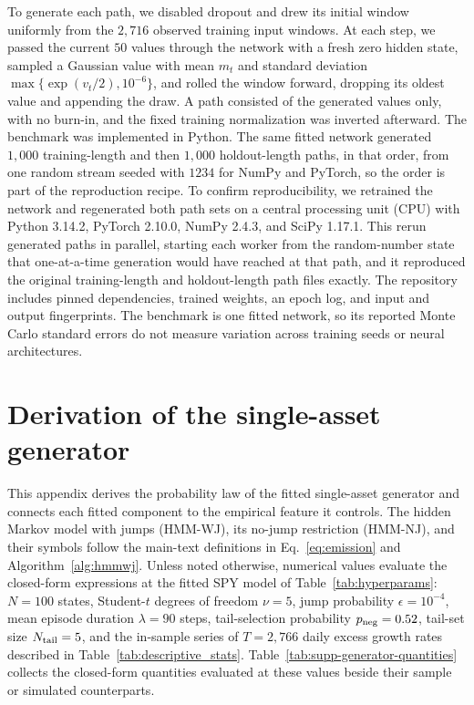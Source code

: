 To generate each path, we disabled dropout and drew its initial
window uniformly from the $2{,}716$ observed training input windows.
At each step, we passed the current $50$ values through the network
with a fresh zero hidden state, sampled a Gaussian value with mean
$m_t$ and standard deviation $\max\{\exp(v_t/2),10^{-6}\}$, and
rolled the window forward, dropping its oldest value and appending
the draw. A path consisted of the generated values only, with no
burn-in, and the fixed training normalization was inverted afterward.
The benchmark was implemented in Python. The same fitted network
generated $1{,}000$ training-length and then $1{,}000$ holdout-length
paths, in that order, from one random stream seeded with $1234$ for
NumPy and PyTorch, so the order is part of the reproduction recipe.
To confirm reproducibility, we retrained the network and regenerated
both path sets on a central processing unit (CPU) with Python 3.14.2,
PyTorch 2.10.0, NumPy 2.4.3, and SciPy 1.17.1. This rerun generated
paths in parallel, starting each worker from the random-number state
that one-at-a-time generation would have reached at that path, and it
reproduced the original training-length and holdout-length path
files exactly. The repository includes pinned dependencies, trained
weights, an epoch log, and input and output fingerprints. The
benchmark is one fitted network, so its reported Monte Carlo standard
errors do not measure variation across training seeds or neural
architectures.


\section{Derivation of the single-asset generator}
\label{sec:supp-generator}

This appendix derives the probability law of the fitted single-asset
generator and connects each fitted component to the empirical feature
it controls. The hidden Markov model with jumps (HMM-WJ), its no-jump
restriction (HMM-NJ), and their symbols follow the main-text
definitions in Eq.~\eqref{eq:emission} and
Algorithm~\ref{alg:hmmwj}. Unless noted otherwise, numerical values
evaluate the closed-form expressions at the fitted SPY model of
Table~\ref{tab:hyperparams}: $N = 100$ states, Student-$t$ degrees of
freedom $\nu = 5$, jump probability $\epsilon = 10^{-4}$, mean episode
duration $\lambda = 90$ steps, tail-selection probability
$p_{\rm neg} = 0.52$, tail-set size $N_{\rm tail} = 5$, and the
in-sample series of $T = 2{,}766$ daily excess growth rates described
in Table~\ref{tab:descriptive_stats}.
Table~\ref{tab:supp-generator-quantities} collects the closed-form
quantities evaluated at these values beside their sample or simulated
counterparts.

